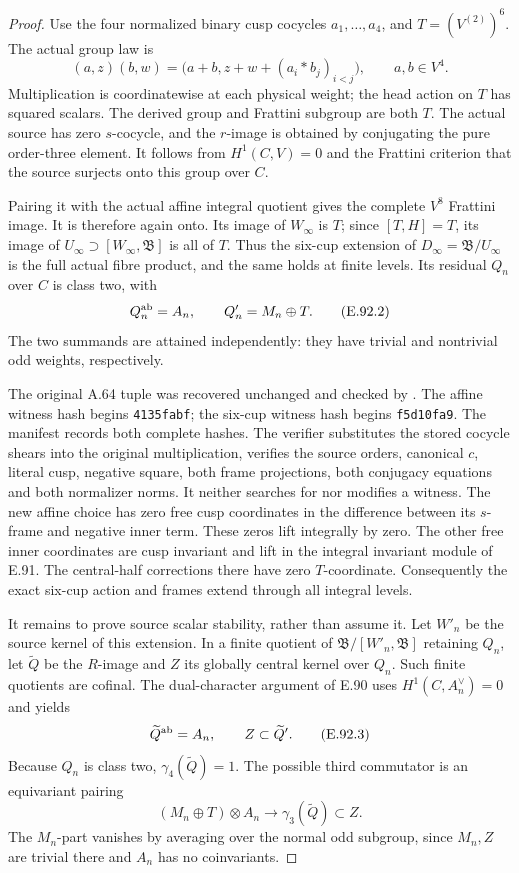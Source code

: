 \begin{proof}
Use the four normalized binary cusp cocycles \(a_1,\ldots,a_4\),
and \(T=(V^{(2)})^6\).  The actual group law is
\[
 (a,z)(b,w)=
 \bigl(a+b,z+w+(a_i*b_j)_{i<j}\bigr),
 \qquad a,b\in V^4.                                    \tag{E.92.1}
\]
Multiplication is coordinatewise at each physical weight;
the head action on \(T\) has squared scalars.
The derived group and Frattini subgroup are both \(T\).
The actual source has zero \(s\)-cocycle, and the \(r\)-image
is obtained by conjugating the pure order-three element.
It follows from \(H^1(C,V)=0\) and the Frattini criterion
that the source surjects onto this group over \(C\).

Pairing it with the actual affine integral quotient gives the
complete \(V^8\) Frattini image.  It is therefore again onto.
Its image of \(W_\infty\) is \(T\); since \([T,H]=T\), its
image of \(U_\infty\supset[W_\infty,\mathfrak B]\) is all of \(T\).
Thus the six-cup extension of \(D_\infty=\mathfrak B/U_\infty\)
is the full actual fibre product, and the same holds at finite levels.
Its residual \(Q_n\) over \(C\) is class two, with
\[
 Q_n^{\rm ab}=A_n,\qquad Q_n'=M_n\oplus T.               \tag{E.92.2}
\]
The two summands are attained independently: they have trivial
and nontrivial odd weights, respectively.

The original A.64 tuple was recovered unchanged and checked by
.
The affine witness hash begins \texttt{4135fabf};
the six-cup witness hash begins \texttt{f5d10fa9}.
The manifest records both complete hashes.
The verifier substitutes the stored cocycle shears into the
original multiplication, verifies the source orders, canonical
\(c\), literal cusp, negative square, both frame projections,
both conjugacy equations and both normalizer norms.
It neither searches for nor modifies a witness.
The new affine choice has zero free cusp coordinates in the
difference between its \(s\)-frame and negative inner term.
These zeros lift integrally by zero.
The other free inner coordinates are cusp invariant and lift
in the integral invariant module of E.91.
The central-half corrections there have zero \(T\)-coordinate.
Consequently the exact six-cup action and frames extend through
all integral levels.

It remains to prove source scalar stability, rather than assume it.
Let \(W'_n\) be the source kernel of this extension.
In a finite quotient of \(\mathfrak B/[W'_n,\mathfrak B]\)
retaining \(Q_n\), let \(\widetilde Q\) be the \(R\)-image
and \(Z\) its globally central kernel over \(Q_n\).
Such finite quotients are cofinal.
The dual-character argument of E.90 uses
\(H^1(C,A_n^\vee)=0\) and yields
\[
 \widetilde Q^{\rm ab}=A_n,\qquad Z\subset\widetilde Q'.
                                                        \tag{E.92.3}
\]
Because \(Q_n\) is class two, \(\gamma_4(\widetilde Q)=1\).
The possible third commutator is an equivariant pairing
\[
 (M_n\oplus T)\otimes A_n
          \longrightarrow\gamma_3(\widetilde Q)\subset Z.
                                                        \tag{E.92.4}
\]
The \(M_n\)-part vanishes by averaging over the normal odd subgroup,
since \(M_n,Z\) are trivial there and \(A_n\) has no coinvariants.


\end{proof}
